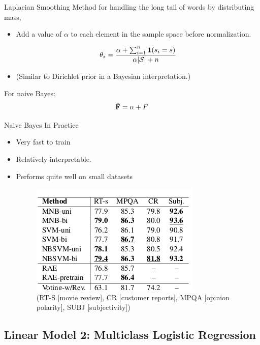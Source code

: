 \documentclass{beamer}
\begin{document}
\begin{frame}{Laplacian Smoothing}
  Method for handling the long tail of words by distributing mass, 
  \begin{itemize}
  \item  Add a value of $\alpha$ to each element in the sample space before normalization.

    \[ \theta_s =  \frac{\alpha + \sum_{i=1}^n \mathbf{1}(s_i = s)}{\alpha|\mathcal{S}|  + n} \]
    
  \item (Similar to Dirichlet prior in a Bayesian interpretation.) 
  \end{itemize}
  
\pause
  For naive Bayes:
  \[\hat{\mathbf{F}} = \alpha + F\]
 
\end{frame}

\begin{frame}{Naive Bayes In Practice}
  \begin{itemize}
  \item Very fast to train
  \item Relatively interpretable.
  \item Performs quite well on small datasets  \cite{wang2012baselines}

  \begin{figure}
    \includegraphics{data}
    \caption{  (RT-S [movie review], CR [customer reports], MPQA [opinion polarity], SUBJ [subjectivity])}
  \end{figure}
\end{itemize}

\end{frame}

\subsection{Linear Model 2: Multiclass Logistic Regression}
\end{document}
